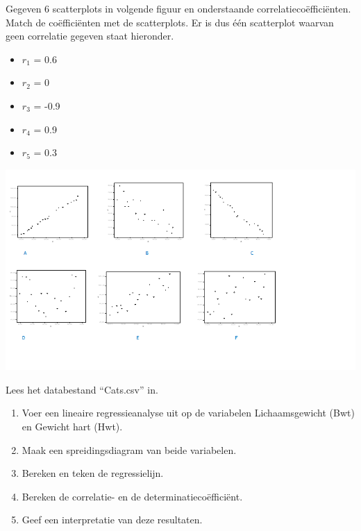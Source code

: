\begin{exercise}
	Gegeven 6 scatterplots in volgende figuur en onderstaande correlatieco\"effici\"enten. Match de co\"effici\"enten met de scatterplots. Er is dus één scatterplot waarvan geen correlatie gegeven staat hieronder.
\begin{itemize}
	\item $r_{1}$ = 0.6
	\item $r_{2}$ = 0
	\item $r_{3}$ = -0.9
	\item $r_{4}$ = 0.9
	\item $r_{5}$ = 0.3
\end{itemize}
	\includegraphics[width=1.10\textwidth]{images/correlaties.png}
	\label{fig:correlaties}
\end{exercise}

\begin{exercise}
	\label{oef:Lineaire regressie, correlatie en determinatiecoëfficiënt met R}
	Lees het databestand ``Cats.csv'' in. 
		\begin{enumerate}
		\item Voer een lineaire regressieanalyse uit op de variabelen Lichaamsgewicht (Bwt) en Gewicht hart (Hwt).
		\item Maak een spreidingsdiagram van beide variabelen.
		\item Bereken en teken de regressielijn.
		\item Bereken de correlatie- en de determinatiecoëfficiënt.
		\item Geef een interpretatie van deze resultaten.
	\end{enumerate}
\end{exercise}

